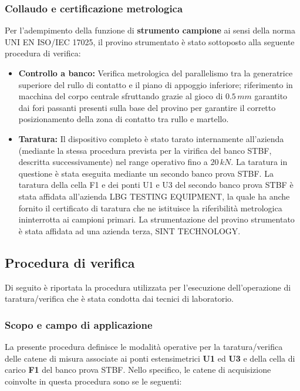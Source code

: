 \documentclass[a4paper, twoside]{article}
\begin{document}
\subsubsection{Collaudo e certificazione metrologica}
Per l'adempimento della funzione di \textbf{strumento campione} ai sensi della norma UNI EN ISO/IEC 17025, il provino strumentato è stato sottoposto alla seguente procedura di verifica:

\begin{itemize}
    \item \textbf{Controllo a banco:} Verifica metrologica del parallelismo  tra la generatrice superiore del rullo di contatto e il piano di appoggio inferiore; riferimento in macchina del corpo centrale sfruttando grazie al gioco di $0.5\,mm$ garantito dai fori passanti presenti sulla base del provino per garantire il corretto posizionamento della  zona di contatto tra rullo e martello.
    \item \textbf{Taratura:} Il dispositivo completo è stato tarato internamente all'azienda (mediante la stessa procedura prevista per la virifica del banco STBF, descritta successivamente)  nel range operativo fino a $20\,kN$. La taratura in questione è stata eseguita mediante un secondo banco prova STBF. La taratura della cella F1 e dei ponti U1 e U3 del secondo banco prova STBF è stata affidata all'azienda LBG TESTING EQUIPMENT, la quale ha anche fornito il certificato di taratura che ne istituisce la riferibilità metrologica ininterrotta ai campioni primari. La strumentazione del provino strumentato è stata affidata ad una azienda terza, SINT TECHNOLOGY.
\end{itemize}

\subsection{Procedura di verifica}

Di seguito è riportata la procedura utilizzata per l'esecuzione dell'operazione di taratura/verifica che è stata condotta dai tecnici di laboratorio.

\subsubsection{Scopo e campo di applicazione}
La presente procedura definisce le modalità operative per la taratura/verifica delle catene di misura associate ai ponti estensimetrici \textbf{U1} ed \textbf{U3} e della cella di carico \textbf{F1} del banco prova STBF. Nello specifico, le catene di acquisizione coinvolte in questa procedura sono se le seguenti:
\end{document}
